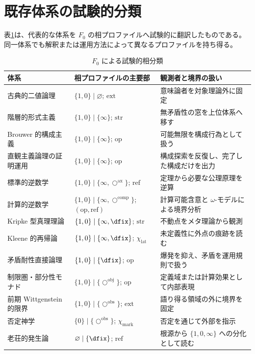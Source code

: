 \documentclass[a4paper,11pt]{ltjsarticle}
\theoremstyle{definition}
\theoremstyle{plain}
\newcommand{\oobs}{\bigcirc^{\mathrm{obs}}}
\newcommand{\oobj}{\bigcirc^{\mathrm{obj}}}
\newcommand{\oax}{\bigcirc^{\mathrm{ax}}}
\newcommand{\ocomp}{\bigcirc^{\mathrm{comp}}}
\begin{document}
\section{既存体系の試験的分類}

表\ref{tab:profiles}は、代表的な体系を $F_0$ の相プロファイルへ試験的に翻訳したものである。同一体系でも解釈または運用方法によって異なるプロファイルを持ち得る。

\begin{table}[htbp]
\centering
\small
\caption{$F_0$ による試験的相分類}
\label{tab:profiles}
\begin{tabular}{>{\raggedright\arraybackslash}p{} >{\raggedright\arraybackslash}p{} >{\raggedright\arraybackslash}p{}}
\toprule
体系 & 相プロファイルの主要部 & 観測者と境界の扱い \\
\midrule
古典的二値論理 & $\{1,0\}\mid\varnothing$; $\mathrm{ext}$ & 意味論者を対象理論外に固定 \\
階層的形式主義 & $\{1,0\}\mid\{\infty\}$; $\mathrm{str}$ & 無矛盾性の窓を上位体系へ移す \\
Brouwer 的構成主義 & $\{1,0\}\mid\{\infty\}$; $\mathrm{op}$ & 可能無限を構成行為として扱う \\
直観主義論理の証明運用 & $\{1,0\}\mid\{\infty\}$; $\mathrm{op}$ & 構成探索を反復し、完了した構成だけを出力 \\
標準的逆数学 & $\{1,0\}\mid\{\infty,\oax\}$; $\mathrm{ref}$ & 定理から必要な公理原理を逆算 \\
計算的逆数学 & $\{1,0\}\mid\{\infty,\ocomp\}$; $(\mathrm{op},\mathrm{ref})$ & 計算可能含意と $\omega$-モデルによる境界分析 \\
Kripke 型真理理論 & $\{1,0\}\mid\{\infty,\dfix\}$; $\mathrm{str}$ & 不動点をメタ理論から観測 \\
Kleene 的再帰論 & $\{1,0\}\mid\{\infty,\dfix\}$; $\chi_{\mathrm{lat}}$ & 未定義性に外点の痕跡を読む \\
矛盾耐性直接論理 & $\{1,0\}\mid\{\dfix\}$; $\mathrm{op}$ & 爆発を抑え、矛盾を運用規則で扱う \\
制限圏・部分性モナド & $\{1,0\}\mid\{\oobj\}$; $\mathrm{op}$ & 定義域または計算効果として内部表現 \\
前期 Wittgenstein 的限界 & $\{1,0\}\mid\{\oobs\}$; $\mathrm{ext}$ & 語り得る領域の外に境界を固定 \\
否定神学 & $\{0\}\mid\{\oobs\}$; $\chi_{\mathrm{mark}}$ & 否定を通じて外部を指示 \\
老荘的発生論 & $\varnothing\mid\{\dfix\}$; $\mathrm{ref}$ & 根源から $\{1,0,\infty\}$ への分化として読む \\

\end{tabular}
\end{table}
\end{document}

